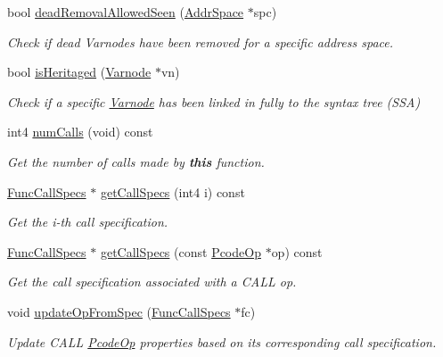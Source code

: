 \begin{DoxyCompactItemize}
bool \mbox{\hyperlink{class_funcdata_adba7696040378f0eaa679e684b72bf96}{dead\+Removal\+Allowed\+Seen}} (\mbox{\hyperlink{class_addr_space}{Addr\+Space}} $\ast$spc)
\begin{DoxyCompactList}\small\item\em Check if dead Varnodes have been removed for a specific address space. \end{DoxyCompactList}\item 
bool \mbox{\hyperlink{class_funcdata_a803cbb38fe59825f59858a16afa54b7d}{is\+Heritaged}} (\mbox{\hyperlink{class_varnode}{Varnode}} $\ast$vn)
\begin{DoxyCompactList}\small\item\em Check if a specific \mbox{\hyperlink{class_varnode}{Varnode}} has been linked in fully to the syntax tree (S\+SA) \end{DoxyCompactList}\item 
int4 \mbox{\hyperlink{class_funcdata_a0901453d881b28305cb071a3cc8a7fe9}{num\+Calls}} (void) const
\begin{DoxyCompactList}\small\item\em Get the number of calls made by {\bfseries{this}} function. \end{DoxyCompactList}\item 
\mbox{\hyperlink{class_func_call_specs}{Func\+Call\+Specs}} $\ast$ \mbox{\hyperlink{class_funcdata_a8bc1d922d37c04236c4f7db44930b4fc}{get\+Call\+Specs}} (int4 i) const
\begin{DoxyCompactList}\small\item\em Get the i-\/th call specification. \end{DoxyCompactList}\item 
\mbox{\hyperlink{class_func_call_specs}{Func\+Call\+Specs}} $\ast$ \mbox{\hyperlink{class_funcdata_a952f07a6db222c00cc243917767dcdc1}{get\+Call\+Specs}} (const \mbox{\hyperlink{class_pcode_op}{Pcode\+Op}} $\ast$op) const
\begin{DoxyCompactList}\small\item\em Get the call specification associated with a C\+A\+LL op. \end{DoxyCompactList}\item 
void \mbox{\hyperlink{class_funcdata_ae4bea7abaa0ea3ade9d04cb78a521aac}{update\+Op\+From\+Spec}} (\mbox{\hyperlink{class_func_call_specs}{Func\+Call\+Specs}} $\ast$fc)
\begin{DoxyCompactList}\small\item\em Update C\+A\+LL \mbox{\hyperlink{class_pcode_op}{Pcode\+Op}} properties based on its corresponding call specification. \end{DoxyCompactList}\item 

\end{DoxyCompactItemize}
